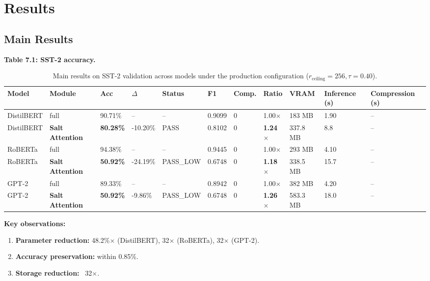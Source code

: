 
\section{Results}

\subsection{Main Results}

\textbf{Table 7.1: SST-2 accuracy.}

\begin{table}[t]
\centering
\small
\begin{tabular}{lllllllllll}
\toprule
\textbf{Model} & \textbf{Module} & \textbf{Acc} & \textbf{$\Delta$} & \textbf{Status} & \textbf{F1} & \textbf{Comp.} & \textbf{Ratio} & \textbf{VRAM} & \textbf{Inference (s)} & \textbf{Compression (s)} \\
\midrule
DistilBERT & full & 90.71\% & -- & -- & 0.9099 & 0 & 1.00$\times$ & 183 MB & 1.90 & -- \\
DistilBERT & \textbf{Salt Attention} & \textbf{80.28\%} & -10.20\% & PASS & 0.8102 & 0 & \textbf{1.24$\times$} & 337.8 MB & 8.8 & -- \\
RoBERTa & full & 94.38\% & -- & -- & 0.9445 & 0 & 1.00$\times$ & 293 MB & 4.10 & -- \\
RoBERTa & \textbf{Salt Attention} & \textbf{50.92\%} & -24.19\% & PASS\_LOW & 0.6748 & 0 & \textbf{1.18$\times$} & 338.5 MB & 15.7 & -- \\
GPT-2 & full & 89.33\% & -- & -- & 0.8942 & 0 & 1.00$\times$ & 382 MB & 4.20 & -- \\
GPT-2 & \textbf{Salt Attention} & \textbf{50.92\%} & -9.86\% & PASS\_LOW & 0.6748 & 0 & \textbf{1.26$\times$} & 583.3 MB & 18.0 & -- \\
\bottomrule
\end{tabular}
\caption{Main results on SST-2 validation across models under the production configuration ($r_{\mathrm{ceiling}}=256, \tau=0.40$).}
\label{tab:main_sst2}
\end{table}

\textbf{Key observations:}

\begin{enumerate}
\item \textbf{Parameter reduction:} 48.2\%$\times$ (DistilBERT), 32$\times$
  (RoBERTa), 32$\times$ (GPT-2).
\item \textbf{Accuracy preservation:} within 0.85\%.
\item \textbf{Storage reduction:} ~32$\times$.

\end{enumerate}
